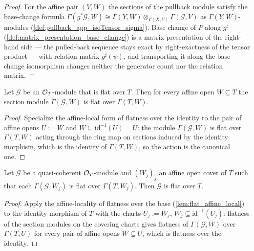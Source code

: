 \begin{proof}
  \leanok
  For the affine pair \((V, W)\) the sections of the pullback module satisfy
  the base-change formula
  \(\Gamma(g^*\mathcal G, W) \cong
    \Gamma(Y, W) \otimes_{\Gamma(X, V)} \Gamma(\mathcal G, V)\)
  as \(\Gamma(Y, W)\)-modules (\cref{def:pullback_app_isoTensor_sigma}).
  Base change of \(P\) along \(g^\sharp\)
  (\cref{def:matrix_presentation_base_change}) is a matrix presentation of
  the right-hand side --- the pulled-back sequence stays exact by
  right-exactness of the tensor product --- with relation matrix
  \(g^\sharp(\psi)\), and transporting it along the base-change isomorphism
  changes neither the generator count nor the relation matrix.
\end{proof}

\begin{lemma}
  \label{lem:flat_sections_of_sheaf_flat}
  \leanok
  Let \(\mathcal G\) be an \(\mathcal{O}_T\)-module that is flat over \(T\).  Then
  for every affine open \(W \subseteq T\) the section module
  \(\Gamma(\mathcal G, W)\) is flat over \(\Gamma(T, W)\).
\end{lemma}

\begin{proof}
  \leanok
  Specialize the affine-local form of flatness over the identity to the pair
  of affine opens \(U := W\) and \(W \subseteq \mathrm{id}^{-1}(U) = U\):
  the module \(\Gamma(\mathcal G, W)\) is flat over \(\Gamma(T, W)\) acting
  through the ring map on sections induced by the identity morphism, which
  is the identity of \(\Gamma(T, W)\), so the action is the canonical one.
\end{proof}

\begin{lemma}
  \label{lem:sheaf_flat_of_flat_charts}
  \leanok
  Let \(\mathcal G\) be a quasi-coherent \(\mathcal{O}_T\)-module and \((W_j)_j\) an
  affine open cover of \(T\) such that each \(\Gamma(\mathcal G, W_j)\) is
  flat over \(\Gamma(T, W_j)\).  Then \(\mathcal G\) is flat over \(T\).
\end{lemma}

\begin{proof}
  \leanok
  Apply the affine-locality of flatness over the base
  (\cref{lem:flat_affine_local}) to the identity morphism of \(T\) with the
  charts \(U_j := W_j\), \(W_j \subseteq \mathrm{id}^{-1}(U_j)\): flatness
  of the section modules on the covering charts gives flatness of
  \(\Gamma(\mathcal G, W)\) over \(\Gamma(T, U)\) for every pair of affine
  opens \(W \subseteq U\), which is flatness over the identity.
\end{proof}

